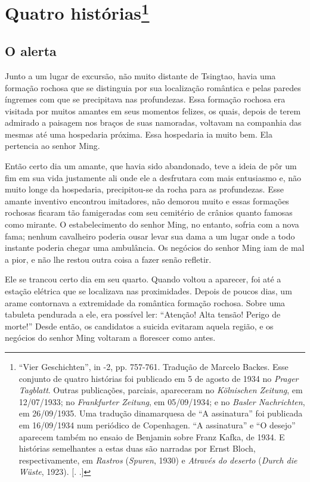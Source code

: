 \chapter{Quatro histórias\footnote[*]{``Vier Geschichten'', in  -2, pp. 757-761.
  Tradução de Marcelo Backes. Esse conjunto de quatro histórias foi
  publicado em 5 de agosto de 1934 no \emph{Prager Tagblatt}. Outras
  publicações, parciais, apareceram no \emph{Kölnischen Zeitung}, em
  12/07/1933; no \emph{Frankfurter Zeitung}, em 05/09/1934; e no
  \emph{Basler Nachrichten}, em 26/09/1935. Uma tradução dinamarquesa de
  ``A assinatura'' foi publicada em 16/09/1934 num periódico de
  Copenhagen. ``A assinatura'' e ``O desejo'' aparecem também no ensaio
  de Benjamin sobre Franz Kafka, de 1934. E histórias semelhantes a
  estas duas são narradas por Ernst Bloch, respectivamente, em
  \emph{Rastros} (\emph{Spuren}, 1930) e \emph{Através do deserto}
  (\emph{Durch die Wüste}, 1923). [. .]} }

\section{O alerta }

Junto a um lugar de excursão, não muito distante de Tsingtao, havia uma
formação rochosa que se distinguia por sua localização romântica e pelas
paredes íngremes com que se precipitava nas profundezas. Essa formação
rochosa era visitada por muitos amantes em seus momentos felizes, os
quais, depois de terem admirado a paisagem nos braços de suas namoradas,
voltavam na companhia das mesmas até uma hospedaria próxima. Essa
hospedaria ia muito bem. Ela pertencia ao senhor Ming.

Então certo dia um amante, que havia sido abandonado, teve a ideia de
pôr um fim em sua vida justamente ali onde ele a desfrutara com mais
entusiasmo e, não muito longe da hospedaria, precipitou-se da rocha para
as profundezas. Esse amante inventivo encontrou imitadores, não demorou
muito e essas formações rochosas ficaram tão famigeradas com seu
cemitério de crânios quanto famosas como mirante. O estabelecimento do
senhor Ming, no entanto, sofria com a nova fama; nenhum cavalheiro
poderia ousar levar sua dama a um lugar onde a todo instante poderia
chegar uma ambulância. Os negócios do senhor Ming iam de mal a pior, e
não lhe restou outra coisa a fazer senão refletir.

Ele se trancou certo dia em seu quarto. Quando voltou a aparecer, foi
até a estação elétrica que se localizava nas proximidades. Depois de
poucos dias, um arame contornava a extremidade da romântica formação
rochosa. Sobre uma tabuleta pendurada a ele, era possível ler:
``Atenção! Alta tensão! Perigo de morte!'' Desde então, os candidatos a
suicida evitaram aquela região, e os negócios do senhor Ming voltaram a
florescer como antes.

